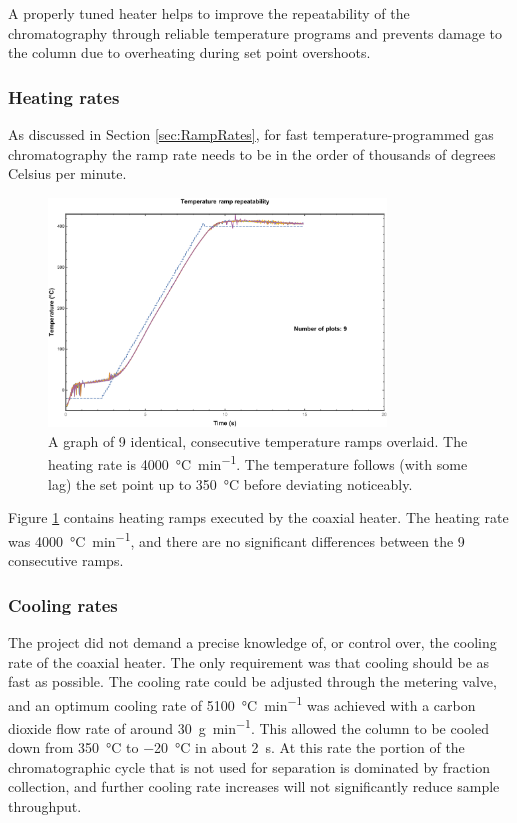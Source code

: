 A properly tuned heater helps to improve the repeatability of the chromatography
through reliable temperature programs and prevents damage to the column due to
overheating during set point overshoots.

\subsubsection{Heating rates}

As discussed in Section \ref{sec:RampRates}, for fast temperature-programmed gas
chromatography the ramp rate needs to be in the order of thousands of degrees
Celsius per minute.

\begin{figure}
	\centering
	\includegraphics[width=0.8\textwidth]{Figures/high_rate_heating.pdf}
	\decoRule
		
\caption[Heating rate illustration]{A graph of 9 identical, consecutive
temperature ramps overlaid. The heating rate is \SI{4000}{\celsius\per\minute}.
The temperature follows (with some lag) the set point up to \SI{350}{\celsius}
before deviating noticeably.}

	\label{fig:4000K/min} 
\end{figure}

Figure \ref{fig:4000K/min} contains heating ramps executed by the coaxial
heater. The heating rate was \SI{4000}{\celsius\per\minute}, and there are no
significant differences between the 9 consecutive ramps.

\subsubsection{Cooling rates}

The project did not demand a precise knowledge of, or control over, the cooling
rate of the coaxial heater. The only requirement was that cooling should be as
fast as possible. The cooling rate could be adjusted through the metering valve,
and an optimum cooling rate of \SI{5100}{\celsius\per\minute} was achieved with
a carbon dioxide flow rate of around \SI{30}{\gram\per\minute}. This allowed the
column to be cooled down from \SI{350}{\celsius} to \SI{-20}{\celsius} in about
\SI{2}{\second}. At this rate the portion of the chromatographic cycle that is
not used for separation is dominated by fraction collection, and further cooling
rate increases will not significantly reduce sample throughput.

